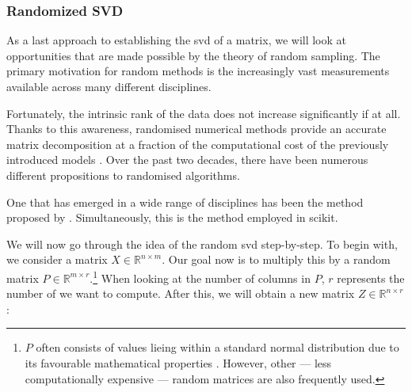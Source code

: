 \vspace*{20mm}


\clearpage


\subsubsection{Randomized SVD}


As a last approach to establishing the \acrlong{svd} of a matrix, we will look at opportunities that are made possible by the theory of random sampling\cite{brunton2019data}. 
The primary motivation for random methods is the increasingly vast measurements available across many different disciplines.

Fortunately, the intrinsic rank of the data does not increase significantly if at all.
Thanks to this awareness, randomised numerical methods provide an accurate matrix decomposition at a fraction of the computational cost of the previously introduced models \cite{brunton2019data}.
Over the past two decades, there have been numerous different propositions to randomised algorithms.
\medskip

One that has emerged in a wide range of disciplines has been the method proposed by .
Simultaneously, this is the method employed in \gls{scikit}.
\bigskip


We will now go through the idea of the random \gls{svd} step-by-step.
To begin with, we consider a matrix $X \in \mathbb{R}^{n \times m}$.
Our goal now is to multiply this by a random matrix $P \in \mathbb{R}^{m \times r}$.\footnote{%
$P$ often consists of values lieing within a standard normal distribution due to its favourable mathematical properties \cite{brunton2019data}. %
However, other --- less computationally expensive --- random matrices are also frequently used.%
}
When looking at the number of columns in $P$, $r$ represents the number of  we want to compute.
After this, we will obtain a new matrix $Z \in \mathbb{R}^{n \times r}$:

